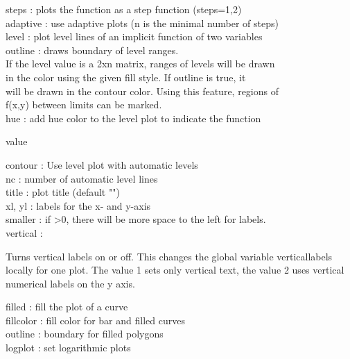 \documentclass[a4paper,10pt]{article}
\begin{document}
\begin{eulernotebook}
\begin{eulercomment}
\begin{eulercomment}
\begin{eulercomment}
\begin{eulercomment}
\begin{eulercomment}
steps     : plots the function as a step function (steps=1,2)\\
adaptive  : use adaptive plots (n is the minimal number of steps)\\
level     : plot level lines of an implicit function of two variables\\
outline   : draws boundary of level ranges.
\\
If the level value is a 2xn matrix, ranges of levels will be drawn\\
in the color using the given fill style. If outline is true, it\\
will be drawn in the contour color. Using this feature, regions of\\
f(x,y) between limits can be marked.
\\
hue       : add hue color to the level plot to indicate the function\\
\end{eulercomment}
\begin{eulerttcomment}
            value
\end{eulerttcomment}
\begin{eulercomment}
contour   : Use level plot with automatic levels\\
nc        : number of automatic level lines\\
title     : plot title (default "")\\
xl, yl    : labels for the x- and y-axis\\
smaller   : if \textgreater{}0, there will be more space to the left for labels.\\
vertical  :\\
\end{eulercomment}
\begin{eulerttcomment}
  Turns vertical labels on or off. This changes the global variable
  verticallabels locally for one plot. The value 1 sets only vertical
  text, the value 2 uses vertical numerical labels on the y axis.
\end{eulerttcomment}
\begin{eulercomment}
filled    : fill the plot of a curve\\
fillcolor : fill color for bar and filled curves\\
outline   : boundary for filled polygons\\
logplot   : set logarithmic plots\\
\end{eulercomment}
\begin{eulerttcomment}

\end{eulerttcomment}
\end{eulercomment}
\end{eulercomment}
\end{eulercomment}
\end{eulercomment}
\end{eulernotebook}
\end{document}
